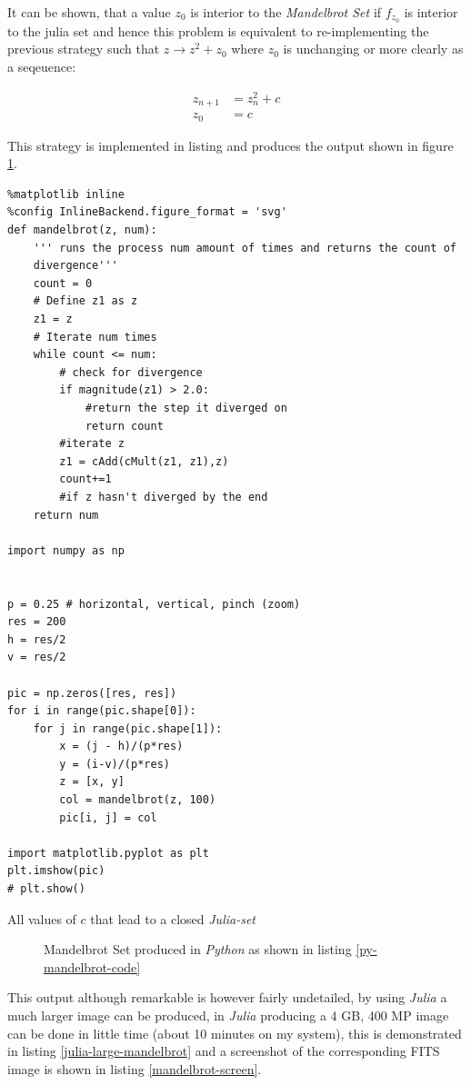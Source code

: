 \documentclass[a4paper,11pt,twoside]{article}
\begin{document}
It can be shown, that a value \(z_{0}\) is interior to the \emph{Mandelbrot Set} if \(f_{z_{0}}\) is interior to the julia set and hence this problem is equivalent to re-implementing the previous strategy such that \(z \rightarrow z^{2} + z_{0}\) where \(z_{0}\) is unchanging or more clearly as a seqeuence:

\begin{align}
z_{n+1} &= z^{2}_n + c \label{eq:mb-sequence} \\
z_{0}   &= c
\end{align}

This strategy is implemented in listing and produces the output shown in figure \ref{mandelbrot-py-pic}.

\begin{listing}[htbp]
\begin{verbatim}
%matplotlib inline
%config InlineBackend.figure_format = 'svg'
def mandelbrot(z, num):
    ''' runs the process num amount of times and returns the count of
    divergence'''
    count = 0
    # Define z1 as z
    z1 = z
    # Iterate num times
    while count <= num:
        # check for divergence
        if magnitude(z1) > 2.0:
            #return the step it diverged on
            return count
        #iterate z
        z1 = cAdd(cMult(z1, z1),z)
        count+=1
        #if z hasn't diverged by the end
    return num

import numpy as np


p = 0.25 # horizontal, vertical, pinch (zoom)
res = 200
h = res/2
v = res/2

pic = np.zeros([res, res])
for i in range(pic.shape[0]):
    for j in range(pic.shape[1]):
        x = (j - h)/(p*res)
        y = (i-v)/(p*res)
        z = [x, y]
        col = mandelbrot(z, 100)
        pic[i, j] = col

import matplotlib.pyplot as plt
plt.imshow(pic)
# plt.show()
\end{verbatim}
\caption{\label{py-mandelbrot-code}All values of \(c\) that lead to a closed \emph{Julia-set}}
\end{listing}

\begin{figure}[htbp]
\centering

\caption{\label{mandelbrot-py-pic}Mandelbrot Set produced in \emph{Python} as shown in listing \ref{py-mandelbrot-code}}
\end{figure}

This output although remarkable is however fairly undetailed, by using \emph{Julia} a much
larger image can be produced, in \emph{Julia} producing a 4 GB, 400 MP image can be done in little time
(about 10 minutes on my system), this is demonstrated in listing \ref{julia-large-mandelbrot}
and a screenshot of the corresponding FITS image is shown in listing \ref{mandelbrot-screen}.
\end{document}
